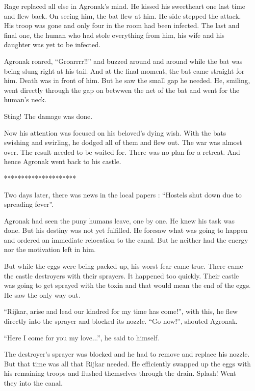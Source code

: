 \documentclass[twoside,11pt,titlepage]{article}
\begin{document}
Rage replaced all else in Agronak's mind. He kissed his sweetheart one last time and flew back. On seeing him, the bat flew at him. He side stepped the attack. His troop was gone and only four in the room had been infected. The last and final one, the human who had stole everything from him, his wife and his daughter was yet to be infected.

Agronak roared, ``Groarrrr!!'' and buzzed around and around while the bat was being slung right at his tail. And at the final moment, the bat came straight for him. Death was in front of him. But he saw the small gap he needed. He, smiling, went directly through the gap on betwwen the net of the bat and went for the human's neck.

Sting! The damage was done.

Now his attention was focused on his beloved's dying wish. With the bats swishing and swirling, he dodged all of them and flew out. The war was almost over. The result needed to be waited for. There was no plan for a retreat. And hence Agronak went back to his castle.

\bigskip
\begin{center}
*********************
\end{center}


Two days later, there was news in the local papers : ``Hostels shut down due to spreading fever''.

Agronak had seen the puny humans leave, one by one. He knew his task was done. But his destiny was not yet fulfilled. He foresaw what was going to happen and ordered an immediate relocation to the canal. But he neither had the energy nor the motivation left in him.

But while the eggs were being packed up, his worst fear came true. There came the castle destroyers with their sprayers. It happened too quickly. Their castle was going to get sprayed with the toxin and that would mean the end of the eggs. He saw the only way out.

``Rijkar, arise and lead our kindred for my time has come!'', with this, he flew directly into the sprayer and blocked its nozzle. ``Go now!'', shouted Agronak.

``Here I come for you my love...'', he said to himself.

The destroyer's sprayer was blocked and he had to remove and replace his nozzle. But that time was all that Rijkar needed. He efficiently swapped up the eggs with his remaining troops and flushed themselves through the drain. Splash! Went they into the canal.
\end{document}
